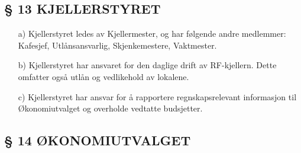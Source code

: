 \subsection*{§ 13 KJELLERSTYRET}

\begin{itemize}
\item[a)] Kjellerstyret ledes av Kjellermester, og har følgende andre
medlemmer: Kafesjef, Utlånsansvarlig, Skjenkemestere, Vaktmester.

\item[b)] Kjellerstyret har ansvaret for den daglige drift av
RF-kjellern. Dette omfatter også utlån og vedlikehold av lokalene.

\item[c)] Kjellerstyret har ansvar for å rapportere regnskapsrelevant informasjon til Økonomiutvalget og overholde vedtatte budsjetter.
\end{itemize}


\subsection*{§ 14 ØKONOMIUTVALGET}

